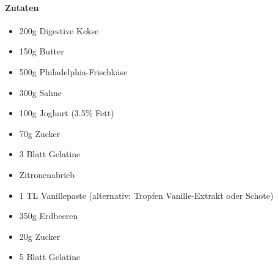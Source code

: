 \clearpage
{}

\paragraph{Zutaten}
\begin{itemize}[noitemsep]
	\item 200g Digestive Kekse
	\item 150g Butter
	\item 500g Philadelphia-Frischkäse
	\item 300g Sahne
	\item 100g Joghurt (3.5\% Fett)
	\item 70g Zucker
	\item 3 Blatt Gelatine 
	\item Zitronenabrieb
	\item 1 TL Vanillepaste (alternativ: Tropfen Vanille-Extrakt oder Schote)
	\item 350g Erdbeeren
	\item 20g Zucker
	\item 5 Blatt Gelatine
\end{itemize}


